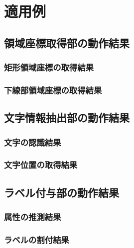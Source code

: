 \chapter{適用例}\label{cha:Indication}




\section{領域座標取得部の動作結果}\label{sec:result_area_coords_obtainment}

\subsection{矩形領域座標の取得結果}\label{subsec:result_rect_area_coords_obtainment}

\subsection{下線部領域座標の取得結果}\label{subsec:result_underline_area_coords_obtainment}


\section{文字情報抽出部の動作結果}\label{sec:result_OCR}

\subsection{文字の認識結果}\label{subsec:result_OCR_char}

\subsection{文字位置の取得結果}\label{subsec:result_OCR_bbox}


\section{ラベル付与部の動作結果}\label{sec:result_area_labeling}

\subsection{属性の推測結果}\label{subsec:result_att_prediction}

\subsection{ラベルの割付結果}\label{subsec:result_label_link}